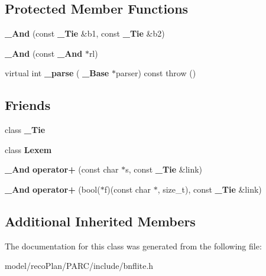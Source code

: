 \subsection*{Protected Member Functions}
\begin{DoxyCompactItemize}
\item 
\mbox{\label{classbnf_1_1___and_ae3d8900b2c6b0d8f0c12b5599db4e225}} 
{\bfseries \+\_\+\+And} (const \textbf{ \+\_\+\+Tie} \&b1, const \textbf{ \+\_\+\+Tie} \&b2)
\item 
\mbox{\label{classbnf_1_1___and_a87b30db4759ec37a1919439938d9c84b}} 
{\bfseries \+\_\+\+And} (const \textbf{ \+\_\+\+And} $\ast$rl)
\item 
\mbox{\label{classbnf_1_1___and_a75af45415ecbf1598ca1a73323d353fd}} 
virtual int {\bfseries \+\_\+parse} (\textbf{ \+\_\+\+Base} $\ast$parser) const  throw ()
\end{DoxyCompactItemize}
\subsection*{Friends}
\begin{DoxyCompactItemize}
\item 
\mbox{\label{classbnf_1_1___and_ab555bd08f573aad86ad95feb76007c15}} 
class {\bfseries \+\_\+\+Tie}
\item 
\mbox{\label{classbnf_1_1___and_a5e39c58451938ac9fc35e0ac18674f12}} 
class {\bfseries Lexem}
\item 
\mbox{\label{classbnf_1_1___and_ab3401f2dc96763fd3fde6f7cb61dbccb}} 
\textbf{ \+\_\+\+And} {\bfseries operator+} (const char $\ast$s, const \textbf{ \+\_\+\+Tie} \&link)
\item 
\mbox{\label{classbnf_1_1___and_aa6647834f11af3c454b2ada531a221e4}} 
\textbf{ \+\_\+\+And} {\bfseries operator+} (bool($\ast$f)(const char $\ast$, size\+\_\+t), const \textbf{ \+\_\+\+Tie} \&link)
\end{DoxyCompactItemize}
\subsection*{Additional Inherited Members}


The documentation for this class was generated from the following file\+:\begin{DoxyCompactItemize}
\item 
model/reco\+Plan/\+P\+A\+R\+C/include/bnflite.\+h\end{DoxyCompactItemize}
